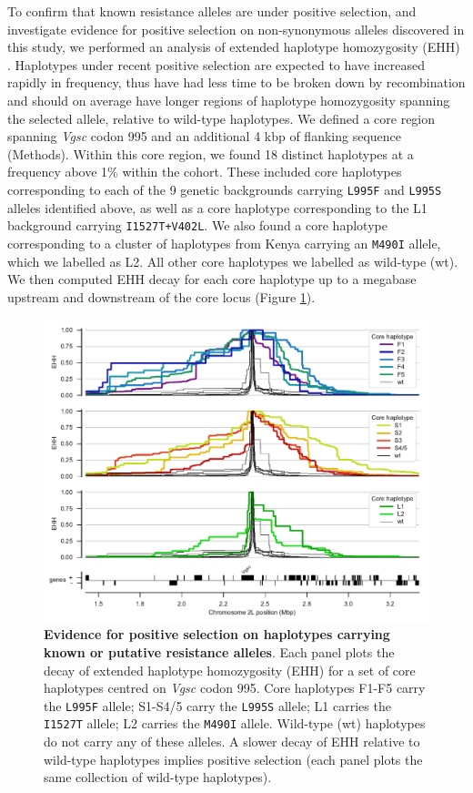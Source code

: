 \documentclass[a4paper,11pt,abstracton,hidelinks]{scrartcl}
\begin{document}
%
To confirm that known resistance alleles are under positive selection, and investigate evidence for positive selection on non-synonymous alleles discovered in this study, we performed an analysis of extended haplotype homozygosity (EHH) \cite{Sabeti2002}.
%
Haplotypes under recent positive selection are expected to have increased rapidly in frequency, thus have had less time to be broken down by recombination and should on average have longer regions of haplotype homozygosity spanning the selected allele, relative to wild-type haplotypes.
%
We defined a core region spanning \textit{Vgsc} codon 995 and an additional 4 kbp of flanking sequence (Methods).
%
Within this core region, we found 18 distinct haplotypes at a frequency above 1\% within the cohort.
%
These included core haplotypes corresponding to each of the 9 genetic backgrounds carrying \texttt{L995F} and \texttt{L995S} alleles identified above, as well as a core haplotype corresponding to the L1 background carrying \texttt{I1527T+V402L}.
%
We also found a core haplotype corresponding to a cluster of haplotypes from Kenya carrying an \texttt{M490I} allele, which we labelled as L2.
%
All other core haplotypes we labelled as wild-type (wt).
%
We then computed EHH decay for each core haplotype up to a megabase upstream and downstream of the core locus (Figure \ref{fig:ehh_decay}).
%


%
\begin{figure}[!t]
  \includegraphics[width=1.1\linewidth,center]{artwork/ehh_decay.pdf}
  \caption{\textbf{Evidence for positive selection on haplotypes carrying known or putative resistance alleles}. Each panel plots the decay of extended haplotype homozygosity (EHH) for a set of core haplotypes centred on \textit{Vgsc} codon 995. Core haplotypes F1-F5 carry the \texttt{L995F} allele; S1-S4/5 carry the \texttt{L995S} allele; L1 carries the \texttt{I1527T} allele; L2 carries the \texttt{M490I} allele. Wild-type (wt) haplotypes do not carry any of these alleles. A slower decay of EHH relative to wild-type haplotypes implies positive selection (each panel plots the same collection of wild-type haplotypes).}
  \label{fig:ehh_decay}
\end{figure}
\end{document}
